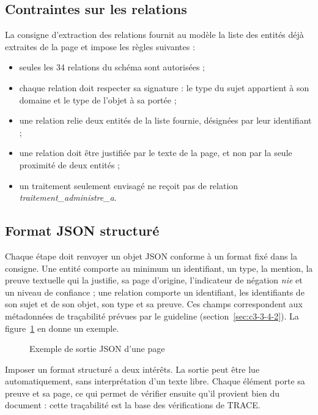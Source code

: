 \subsection{Contraintes sur les relations}\label{sec:c4-contraintes-relations}

La consigne d'extraction des relations fournit au modèle la liste des entités déjà extraites de la page et impose les règles suivantes :
\begin{itemize}
  \item seules les 34 relations du schéma sont autorisées ;
  \item chaque relation doit respecter sa signature : le type du sujet appartient à son domaine et le type de l'objet à sa portée ;
  \item une relation relie deux entités de la liste fournie, désignées par leur identifiant ;
  \item une relation doit être justifiée par le texte de la page, et non par la seule proximité de deux entités ;
  \item un traitement seulement envisagé ne reçoit pas de relation \emph{traitement\_administre\_a}.
\end{itemize}

\subsection{Format JSON structuré}\label{sec:c4-json}

Chaque étape doit renvoyer un objet JSON conforme à un format fixé dans la consigne. Une entité comporte au minimum un identifiant, un type, la mention, la preuve textuelle qui la justifie, sa page d'origine, l'indicateur de négation \emph{nie} et un niveau de confiance ; une relation comporte un identifiant, les identifiants de son sujet et de son objet, son type et sa preuve. Ces champs correspondent aux métadonnées de traçabilité prévues par le guideline (section~\ref{sec:c3-3-4-2}). La figure~\ref{fig:c4-json} en donne un exemple.

\begin{figure}[H]
\centering
{}
\caption{Exemple de sortie JSON d'une page}\label{fig:c4-json}
\end{figure}

Imposer un format structuré a deux intérêts. La sortie peut être lue automatiquement, sans interprétation d'un texte libre. Chaque élément porte sa preuve et sa page, ce qui permet de vérifier ensuite qu'il provient bien du document : cette traçabilité est la base des vérifications de TRACE.

